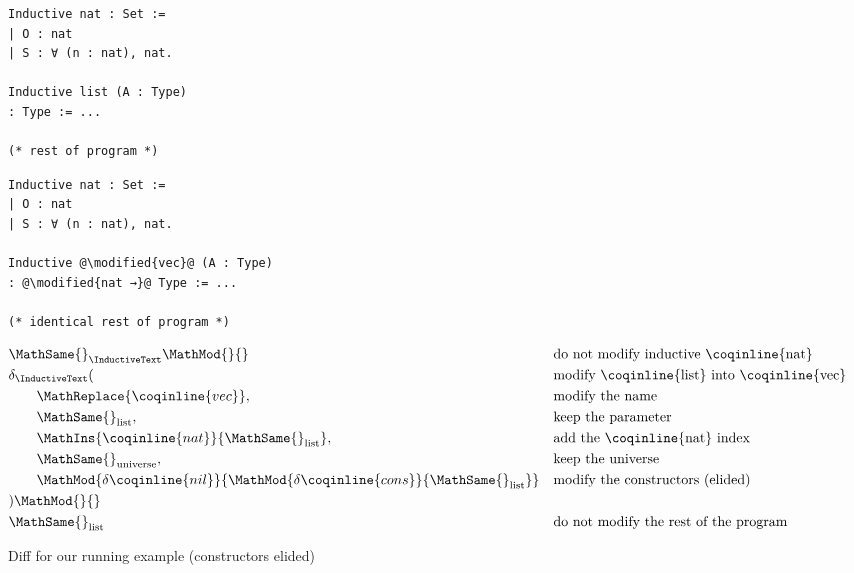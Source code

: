 \begin{figure*}[!htp]

  \noindent%
  \begin{minipage}[t]{0.50\textwidth}
    \begin{verbatim}
Inductive nat : Set :=
| O : nat
| S : ∀ (n : nat), nat.

Inductive list (A : Type)
: Type := ...

(* rest of program *)
    \end{verbatim}
  \end{minipage}%
  \begin{minipage}[t]{0.50\textwidth}
    \begin{verbatim}
Inductive nat : Set :=
| O : nat
| S : ∀ (n : nat), nat.

Inductive @\modified{vec}@ (A : Type)
: @\modified{nat →}@ Type := ...

(* identical rest of program *)
    \end{verbatim}
  \end{minipage}

  \vspace{2em}%

  \begin{align*}
&\MathSame{}_{\InductiveText} \MathMod{}{} && \text{do not modify inductive \coqinline{nat}}\\
& \delta_{\InductiveText} ( && \text{modify \coqinline{list} into \coqinline{vec}} \\
& \qquad \MathReplace{\coqinline{vec}}, && \text{modify the name} \\
& \qquad \MathSame{}_{\text{list}},       && \text{keep the parameter} \\
& \qquad \MathIns{\coqinline{nat}}{\MathSame{}_{\text{list}}}, && \text{add the \coqinline{nat} index} \\
& \qquad \MathSame{}_{\text{universe}}, && \text{keep the universe} \\
& \qquad \MathMod{\delta\coqinline{nil}}{\MathMod{\delta\coqinline{cons}}{\MathSame{}_{\text{list}}}}
  && \text{modify the constructors (elided)} \\
& ) \MathMod{}{} && \\
& \MathSame{}_{\text{list}} && \text{do not modify the rest of the program}
  \end{align*}

  \caption{Diff for our running example (constructors elided)}
  \label{diff-list-vec}

\end{figure*}

